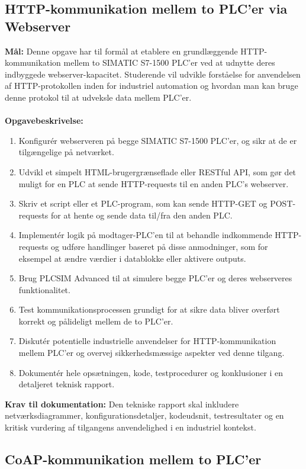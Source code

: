 \subsection*{HTTP-kommunikation mellem to PLC'er via Webserver}
\label{subsec:http_communication_plc}

\textbf{Mål:} Denne opgave har til formål at etablere en grundlæggende HTTP-kommunikation mellem to SIMATIC S7-1500 PLC'er ved at udnytte deres indbyggede webserver-kapacitet. Studerende vil udvikle forståelse for anvendelsen af HTTP-protokollen inden for industriel automation og hvordan man kan bruge denne protokol til at udveksle data mellem PLC'er.
\\\\
\noindent\textbf{Opgavebeskrivelse:}	
\begin{enumerate}
	\item Konfigurér webserveren på begge SIMATIC S7-1500 PLC'er, og sikr at de er tilgængelige på netværket.
	\item Udvikl et simpelt HTML-brugergrænseflade eller RESTful API, som gør det muligt for en PLC at sende HTTP-requests til en anden PLC's webserver.
	\item Skriv et script eller et PLC-program, som kan sende HTTP-GET og POST-requests for at hente og sende data til/fra den anden PLC.
	\item Implementér logik på modtager-PLC'en til at behandle indkommende HTTP-requests og udføre handlinger baseret på disse anmodninger, som for eksempel at ændre værdier i datablokke eller aktivere outputs.
	\item Brug PLCSIM Advanced til at simulere begge PLC'er og deres webserveres funktionalitet.
	\item Test kommunikationsprocessen grundigt for at sikre data bliver overført korrekt og pålideligt mellem de to PLC'er.
	\item Diskutér potentielle industrielle anvendelser for HTTP-kommunikation mellem PLC'er og overvej sikkerhedsmæssige aspekter ved denne tilgang.
	\item Dokumentér hele opsætningen, kode, testprocedurer og konklusioner i en detaljeret teknisk rapport.
\end{enumerate}	
\textbf{Krav til dokumentation:} Den tekniske rapport skal inkludere netværksdiagrammer, konfigurationsdetaljer, kodeudsnit, testresultater og en kritisk vurdering af tilgangens anvendelighed i en industriel kontekst.

\subsection*{CoAP-kommunikation mellem to PLC'er}
\label{subsec:coap_communication_plc}

